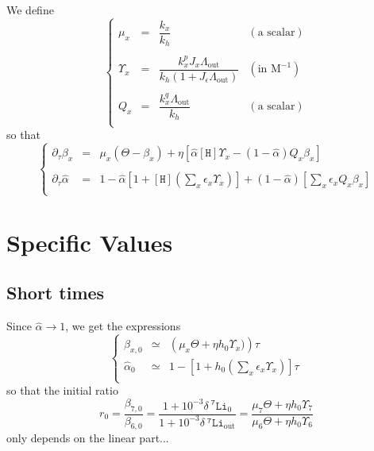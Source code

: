 \documentclass[aps,onecolumn,10pt]{revtex4}
\newcommand{\mychem}[1]{\mathtt{#1}}
\newcommand{\myconc}[1]{\left\lbrack{#1}\right\rbrack}
\newcommand{\spLi}[1]{{~^{\mychem{#1}}\mychem{Li}}}
\newcommand{\spproton}{\mychem{H}}
\newcommand{\proton}{\myconc{\spproton}}
\newcommand{\deltaLi}{ {\delta\!\!\!\spLi{7}} }
\newcommand{\deltaLiOut}{{\deltaLi}_{\mathrm{out}}}
\newcommand{\LiAll}{\Lambda}
\newcommand{\LiAllOut}{{\LiAll}_{\mathrm{out}}}
\begin{document}
We define 
\begin{equation}
\left\lbrace
\begin{array}{rcll}
	\mu_x      & = & \dfrac{k_x}{k_h} & (\text{a scalar})\\
	\\
	\Upsilon_x & = & \dfrac{k_x^pJ_x \LiAllOut}{k_h\left(1+ J_\epsilon\LiAllOut\right)} & (\text{in M}^{-1})
	 \\
	 \\
	Q_x & = & \dfrac{k_x^q \LiAllOut}{k_h} & (\text{a scalar})\\
\end{array}
\right.
\end{equation}
so that
\begin{equation}
\boxed{
\left\lbrace
\begin{array}{rcl}
\partial_\tau \beta_x  & = &  \mu_x \left(\Theta -\beta_x \right) + \eta \left[ \hat\alpha \proton \Upsilon_x  -  \left(1-\hat\alpha\right) Q_x\beta_x \right] \\
\\
	\partial_\tau \hat\alpha & = & 1 - 
		\hat\alpha \left\lbrack 1+ \proton \left(\sum_x \epsilon_x \Upsilon_x \right)\right] + (1-\hat\alpha) \left\lbrack {\sum_x  \epsilon_x Q_x \beta_x }  \right\rbrack \\
\end{array}
\right.
}
\end{equation}

\section{Specific Values}
\subsection{Short times}
Since $\hat\alpha\to1$, we get the expressions
\begin{equation}
\left\lbrace
\begin{array}{rcl}
\beta_{x,0} & \simeq & \left(\mu_x \Theta + \eta h_0 \Upsilon_x)\right)\tau\\
\hat\alpha_{0} & \simeq & 1 - \left[1+h_0 \left(\sum_x \epsilon_x \Upsilon_x\right)\right] \tau\\
\end{array}
\right.
\end{equation}
so that the initial ratio
\begin{equation}
	\label{eq:r0}
	r_0 = \dfrac{\beta_{7,0}}{\beta_{6,0}} = \dfrac{1+10^{-3}\deltaLi_0}{1+10^{-3}\deltaLiOut}
	 = \dfrac{\mu_7\Theta+\eta h_0 \Upsilon_7}{\mu_6\Theta+\eta h_0 \Upsilon_6}
\end{equation}
only depends on the linear part...
\end{document}
